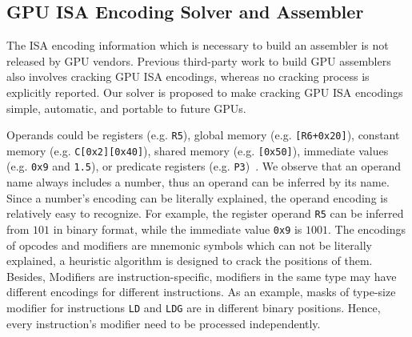 \subsection{GPU ISA Encoding Solver and Assembler}

The ISA encoding information which is necessary to build an assembler is not released by GPU vendors.
Previous third-party work to build GPU assemblers~\cite{decuda,asfermi,maxas} also
involves cracking GPU ISA encodings, whereas no cracking process is explicitly reported.
Our solver is proposed to make cracking GPU ISA encodings simple, automatic, and portable to future GPUs.

Operands could be registers (e.g. {\tt R5}),
global memory (e.g. {\tt [R6+0x20]}), constant memory (e.g. {\tt C[0x2][0x40]}), shared memory (e.g. {\tt [0x50]}), immediate values (e.g. {\tt 0x9} and {\tt1.5}), or predicate registers (e.g. {\tt P3})~\cite{ptx2015isa}.
We observe that an operand name always includes a number, thus an operand can be inferred by its name.
Since a number's encoding can be literally explained, the operand encoding is relatively easy to recognize.
For example, the register operand {\tt R5} can be inferred from $101$ in binary format, while the immediate value {\tt 0x9} is $1001$. 
The encodings of opcodes and modifiers are mnemonic symbols which can not be literally explained,
a heuristic algorithm is designed to crack the positions of them.
Besides, Modifiers are instruction-specific, modifiers in the same type may have different encodings for different instructions. 
As an example, masks of type-size modifier for instructions {\tt LD} and {\tt LDG} are in different binary positions. 
Hence, every instruction's modifier need to be processed independently. 






